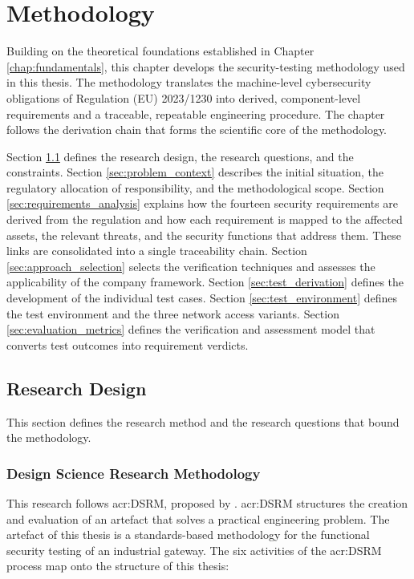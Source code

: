 \chapter{Methodology} 
\label{chap:methodology}


Building on the theoretical foundations established in Chapter \ref{chap:fundamentals}, this chapter develops the security-testing methodology used in this thesis. The methodology translates the machine-level cybersecurity obligations of Regulation (EU) 2023/1230 into derived, component-level requirements and a traceable, repeatable engineering procedure. The chapter follows the derivation chain that forms the scientific core of the methodology.

Section \ref{sec:research_design} defines the research design, the research questions, and the constraints. Section \ref{sec:problem_context} describes the initial situation, the regulatory allocation of responsibility, and the methodological scope.  Section \ref{sec:requirements_analysis} explains how the fourteen security requirements are derived from the regulation and how each requirement is mapped to the affected assets, the relevant threats, and the security functions that address them. These links are consolidated into a single traceability chain. Section \ref{sec:approach_selection} selects the verification techniques and assesses the applicability of the company framework. Section \ref{sec:test_derivation} defines the development of the individual test cases. Section \ref{sec:test_environment} defines the test environment and the three network access variants. Section \ref{sec:evaluation_metrics} defines the verification and assessment model that converts test outcomes into requirement verdicts.


\section{Research Design} 
\label{sec:research_design} 
This section defines the research method and the research questions that bound the methodology.

\subsection{Design Science Research Methodology} 
\label{subsec:dsrm} 

This research follows \gls{acr:DSRM}, proposed by \citeauthor{Peffers} \cite[p. 46]{Peffers}. \gls{acr:DSRM} structures the creation and evaluation of an artefact that solves a practical engineering problem. The artefact of this thesis is a standards-based methodology for the functional security testing of an industrial gateway. The six activities of the \gls{acr:DSRM} process map onto the structure of this thesis: 


